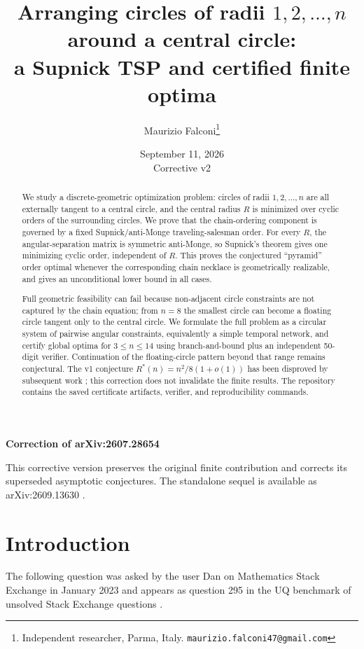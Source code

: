 \documentclass[11pt]{article}
\title{Arranging circles of radii $1,2,\dots,n$ around a central circle:\\
a Supnick TSP and certified finite optima}
\author{Maurizio Falconi\thanks{Independent researcher, Parma, Italy. \texttt{maurizio.falconi47@gmail.com}}}
\date{September 11, 2026\\\small Corrective v2}
\theoremstyle{definition}
\theoremstyle{remark}
\begin{document}
\maketitle
\begin{center}
\small\textbf{Correction of arXiv:2607.28654}
\end{center}
This corrective version preserves the original finite contribution and corrects
its superseded asymptotic conjectures. The standalone sequel is available as
arXiv:2609.13630 \cite{sequel}.

\begin{abstract}
We study a discrete-geometric optimization problem: circles of radii $1,2,\dots,n$ are all externally tangent to a central circle, and the central radius $R$ is minimized over cyclic orders of the surrounding circles. We prove that the chain-ordering component is governed by a fixed Supnick/anti-Monge traveling-salesman order. For every $R$, the angular-separation matrix is symmetric anti-Monge, so Supnick's theorem gives one minimizing cyclic order, independent of $R$. This proves the conjectured ``pyramid'' order optimal whenever the corresponding chain necklace is geometrically realizable, and gives an unconditional lower bound in all cases.

Full geometric feasibility can fail because non-adjacent circle constraints are not captured by the chain equation; from $n=8$ the smallest circle can become a floating circle tangent only to the central circle. We formulate the full problem as a circular system of pairwise angular constraints, equivalently a simple temporal network, and certify global optima for $3\le n\le14$ using branch-and-bound plus an independent 50-digit verifier. Continuation of the floating-circle pattern beyond that range remains conjectural. The v1 conjecture $R^\ast(n)=n^2/8(1+o(1))$ has been disproved by subsequent work \cite{sequel}; this correction does not invalidate the finite results. The repository contains the saved certificate artifacts, verifier, and reproducibility commands.
\end{abstract}

\section{Introduction}

The following question was asked by the user Dan on Mathematics Stack Exchange in January 2023 \cite{mse} and appears as question 295 in the UQ benchmark of unsolved Stack Exchange questions \cite{uq}.
\end{document}
